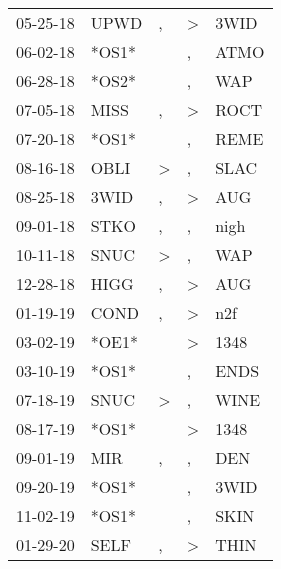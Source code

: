 \begin{supertabular}{lllll}
 05-25-18 &   UPWD &             , &  \textgreater &  3WID \\
 06-02-18 &  *OS1* &               &             , &  ATMO \\
 06-28-18 &  *OS2* &               &             , &   WAP \\
 07-05-18 &   MISS &             , &  \textgreater &  ROCT \\
 07-20-18 &  *OS1* &               &             , &  REME \\
 08-16-18 &   OBLI &  \textgreater &             , &  SLAC \\
 08-25-18 &   3WID &             , &  \textgreater &   AUG \\
 09-01-18 &   STKO &             , &             , &  nigh \\
 10-11-18 &   SNUC &  \textgreater &             , &   WAP \\
 12-28-18 &   HIGG &             , &  \textgreater &   AUG \\
 01-19-19 &   COND &             , &  \textgreater &   n2f \\
 03-02-19 &  *OE1* &               &  \textgreater &  1348 \\
 03-10-19 &  *OS1* &               &             , &  ENDS \\
 07-18-19 &   SNUC &  \textgreater &             , &  WINE \\
 08-17-19 &  *OS1* &               &  \textgreater &  1348 \\
 09-01-19 &    MIR &             , &             , &   DEN \\
 09-20-19 &  *OS1* &               &             , &  3WID \\
 11-02-19 &  *OS1* &               &             , &  SKIN \\
 01-29-20 &   SELF &             , &  \textgreater &  THIN \\
\end{supertabular}
